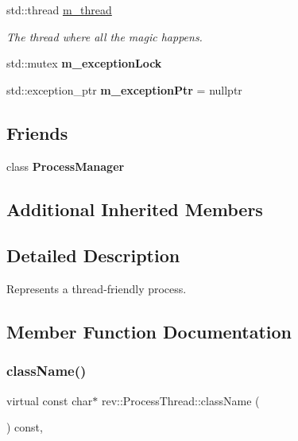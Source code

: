 \begin{Indent}
\begin{DoxyCompactItemize}
std\+::thread \mbox{\hyperlink{classrev_1_1_process_thread_a6972c0eb34f36a442f089d067cc80f56}{m\+\_\+thread}}
\begin{DoxyCompactList}\small\item\em The thread where all the magic happens. \end{DoxyCompactList}\item 
\mbox{\label{classrev_1_1_process_thread_a42e6a92f6f2caf723c02dc02947d8c04}} 
std\+::mutex {\bfseries m\+\_\+exception\+Lock}
\item 
\mbox{\label{classrev_1_1_process_thread_ae46408928e1e9279c70b471bc3bfba28}} 
std\+::exception\+\_\+ptr {\bfseries m\+\_\+exception\+Ptr} = nullptr
\end{DoxyCompactItemize}
\end{Indent}
\subsection*{Friends}
\begin{DoxyCompactItemize}
\item 
\mbox{\label{classrev_1_1_process_thread_ae1701c7594fe2cf1c96b951a52eb0396}} 
class {\bfseries Process\+Manager}
\end{DoxyCompactItemize}
\subsection*{Additional Inherited Members}


\subsection{Detailed Description}
Represents a thread-\/friendly process. 

\subsection{Member Function Documentation}
\mbox{\label{classrev_1_1_process_thread_a61ecc9b8d9234f25418adee22c062874}} 
\subsubsection{\texorpdfstring{className()}{className()}}
{\footnotesize\ttfamily virtual const char$\ast$ rev\+::\+Process\+Thread\+::class\+Name (\begin{DoxyParamCaption}{ }\end{DoxyParamCaption}) const\hspace{0.3cm}{\ttfamily [inline]}, {\ttfamily [virtual]}}



